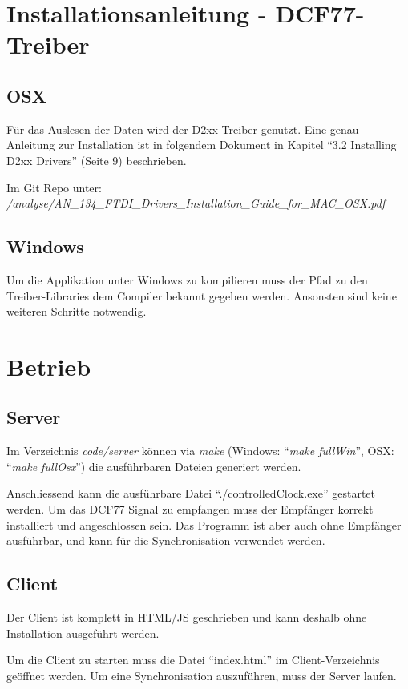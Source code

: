 \section{Installationsanleitung - DCF77-Treiber}
\subsection{OSX}
Für das Auslesen der Daten wird der D2xx Treiber genutzt. Eine genau Anleitung zur Installation ist in folgendem Dokument in Kapitel "`3.2 Installing D2xx Drivers"' (Seite 9) beschrieben.

Im Git Repo unter:\\
\textit{/analyse/AN\_134\_FTDI\_Drivers\_Installation\_Guide\_for\_MAC\_OSX.pdf}

\subsection{Windows}
Um die Applikation unter Windows zu kompilieren muss der Pfad zu den Treiber-Libraries dem Compiler bekannt gegeben werden. Ansonsten sind keine weiteren Schritte notwendig.

\section{Betrieb}
\subsection{Server}
Im Verzeichnis \textit{code/server} können via \textit{make} (Windows: "`\textit{make fullWin}"', OSX: "`\textit{make fullOsx}"') die ausführbaren Dateien generiert werden.

Anschliessend kann die ausführbare Datei "`./controlledClock.exe"' gestartet werden. Um das DCF77 Signal zu empfangen muss der Empfänger korrekt installiert und angeschlossen sein. Das Programm ist aber auch ohne Empfänger ausführbar, und kann für die Synchronisation verwendet werden.

\subsection{Client}
Der Client ist komplett in HTML/JS geschrieben und kann deshalb ohne Installation ausgeführt werden. 

Um die Client zu starten muss die Datei "`index.html"' im Client-Verzeichnis geöffnet werden. Um eine Synchronisation auszuführen, muss der Server laufen.
